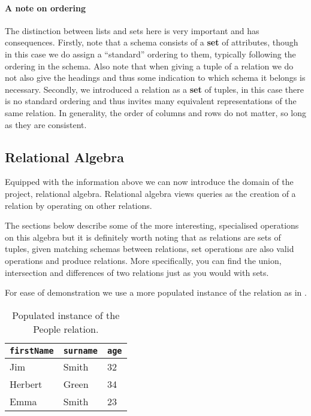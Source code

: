 \paragraph{A note on ordering} The distinction between lists and sets here is very important and has consequences. Firstly, note that a schema consists of a \textbf{set} of attributes, though in this case we do assign a ``standard'' ordering to them, typically following the ordering in the schema. Also note that when giving a tuple of a relation we do not also give the headings and thus some indication to which schema it belongs is necessary. Secondly, we introduced a relation as a \textbf{set} of tuples, in this case there is no standard ordering and thus invites many equivalent representations of the same relation.\cite{DatabaseSystems} In generality, the order of columns and rows do not matter, so long as they are consistent.

\subsection{Relational Algebra}
Equipped with the information above we can now introduce the domain of the project, relational algebra. Relational algebra views queries as the creation of a relation by operating on other relations.\cite{RelationalCalculus}

The sections below describe some of the more interesting, specialised operations on this algebra but it is definitely worth noting that as relations are sets  of tuples, given matching schemas between relations, set operations are also valid operations and produce relations.\cite{RelationalModel} More specifically, you can find the union, intersection and differences of two relations just as you would with sets. \cite{DatabaseSystems}

For ease of demonstration we use a more populated instance of the  relation as in .

\begin{table}[h]
  \centering
  \begin{tabular}{l|l|l}
    \verb|firstName| & \verb|surname| & \verb|age| \\
    \hline\hline
    Jim & Smith & 32\\
    Herbert & Green & 34\\
    Emma & Smith & 23\\
  \end{tabular}
  \caption{Populated instance of the People relation.}
  \label{tab:peopleRelationPopulated}
\end{table}
